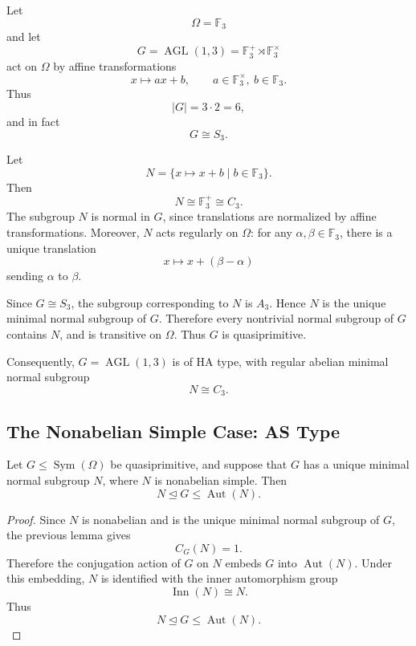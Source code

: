 \begin{example}
    Let
    \[
        \Omega=\mathbb F_3
    \]
    and let
    \[
        G=\operatorname{AGL}(1,3)
        =
        \mathbb F_3^+ \rtimes \mathbb F_3^\times
    \]
    act on \(\Omega\) by affine transformations
    \[
        x\longmapsto ax+b,
        \qquad
        a\in \mathbb F_3^\times,\ b\in \mathbb F_3.
    \]
    Thus
    \[
        |G|=3\cdot 2=6,
    \]
    and in fact
    \[
        G\cong S_3.
    \]
    
    Let
    \[
        N=\{x\mapsto x+b\mid b\in\mathbb F_3\}.
    \]
    Then
    \[
        N\cong \mathbb F_3^+\cong C_3.
    \]
    The subgroup \(N\) is normal in \(G\), since translations are normalized by affine
    transformations. Moreover, \(N\) acts regularly on \(\Omega\): for any
    \(\alpha,\beta\in\mathbb F_3\), there is a unique translation
    \[
        x\mapsto x+(\beta-\alpha)
    \]
    sending \(\alpha\) to \(\beta\).
    
    Since \(G\cong S_3\), the subgroup corresponding to \(N\) is \(A_3\). Hence \(N\) is the
    unique minimal normal subgroup of \(G\). Therefore every nontrivial normal subgroup of
    \(G\) contains \(N\), and is transitive on \(\Omega\). Thus \(G\) is quasiprimitive.
    
    Consequently, \(G=\operatorname{AGL}(1,3)\) is of \(\mathrm{HA}\) type, with regular
    abelian minimal normal subgroup
    \[
        N\cong C_3.
    \]
    \end{example}

\subsection{The Nonabelian Simple Case: AS Type}

\begin{proposition}
Let \(G\leq \operatorname{Sym}(\Omega)\) be quasiprimitive, and suppose that \(G\) has a
unique minimal normal subgroup \(N\), where \(N\) is nonabelian simple. Then
\[
    N\unlhd G\leq \operatorname{Aut}(N).
\]
\end{proposition}

\begin{proof}
Since \(N\) is nonabelian and is the unique minimal normal subgroup of \(G\), the previous
lemma gives
\[
    C_G(N)=1.
\]
Therefore the conjugation action of \(G\) on \(N\) embeds \(G\) into \(\operatorname{Aut}(N)\).
Under this embedding, \(N\) is identified with the inner automorphism group
\[
    \operatorname{Inn}(N)\cong N.
\]
Thus
\[
    N\unlhd G\leq \operatorname{Aut}(N).
\]
\end{proof}

